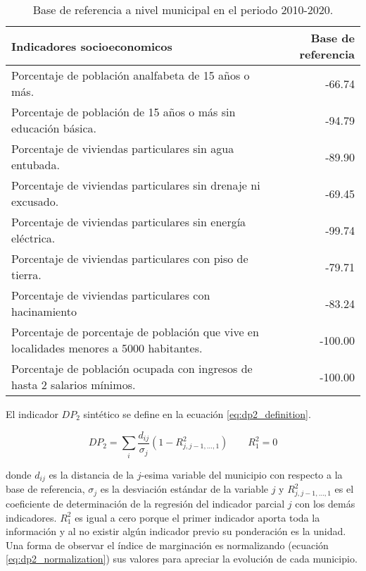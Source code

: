 \begin{table}[H]
    \changefontsizes{9pt}
    \centering
    \begin{tabular}{lr} \hline
        Indicadores socioeconomicos                                                              & Base de referencia \\  \hline
        Porcentaje de población analfabeta de 15 años o más.                                     & -66.74             \\
        Porcentaje de población de 15 años o más sin educación básica.                           & -94.79             \\
        Porcentaje de viviendas particulares sin agua entubada.                                  & -89.90             \\
        Porcentaje de viviendas particulares sin drenaje ni excusado.                            & -69.45             \\
        Porcentaje de viviendas particulares sin energía eléctrica.                              & -99.74             \\
        Porcentaje de viviendas particulares con piso de tierra.                                 & -79.71             \\
        Porcentaje de viviendas particulares con hacinamiento                                    & -83.24             \\
        Porcentaje de porcentaje de población que vive en localidades menores a 5000 habitantes. & -100.00            \\
        Porcentaje de población ocupada con ingresos de hasta 2 salarios mínimos.                & -100.00            \\ \hline
    \end{tabular}
    \normalsize
    \caption{Base de referencia a nivel municipal en el periodo 2010-2020.}
    \label{table:base_de_referencia}
\end{table}

El indicador $DP_2$ sintético se define en la ecuación \ref{eq:dp2_definition}.

\begin{equation}
    DP_2 =  \sum_{i} \frac{d_{ij}}{\sigma_j} (1-R_{j,j-1,\dots,1}^2) \qquad R_1^2=0
    \label{eq:dp2_definition}
\end{equation}

donde $d_{ij}$ es la distancia de la $j$-esima variable del municipio con respecto a la base de referencia, $\sigma_j$ es la desviación estándar de la variable $j$ y $R_{j,j-1,\dots,1}^2$ es el coeficiente de determinación de la regresión del indicador parcial $j$ con los demás indicadores. $R_1^2$ es igual a cero porque el primer indicador aporta toda la información y al no existir algún indicador previo su ponderación es la unidad. Una forma de observar el índice de marginación es normalizando (ecuación \ref{eq:dp2_normalization}) sus valores para apreciar la evolución de cada municipio\cite{Somarriba_2013}.

